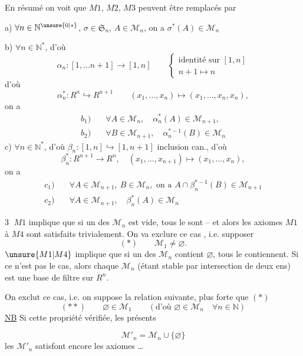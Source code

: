 En résumé on voit que $M1$, $M2$, $M3$ peuvent être remplacés par

a)  $\forall n\in\mathbb N^{\unsure{0|*}}$, $\sigma\in\mathfrak S_n$, $A\in\mathcal M_n$, on a $\sigma^*(A)\in\mathcal M_n$

b) $\forall n\in\mathbb N^*$, d'où
\[
\alpha_n:[1,\ldots n+1]\longrightarrow[1,n]\qquad
\left\{\begin{gathered}\text{identité sur }[1,n]\\ n+1\longmapsto n\end{gathered}\right.
\]
d'où 
\[
\alpha_n^*:R^n\hookrightarrow R^{n+1}\qquad(x_1,\ldots,x_n)\longmapsto(x_1,\ldots,x_n,x_n),
\]
on a
\[
\begin{aligned}
b_1)\quad&\forall A\in\mathcal M_n,\quad\alpha_n^*(A)\in\mathcal M_{n+1},\\
b_2)\quad&\forall B\in\mathcal M_{n+1},\quad\alpha_n^{*-1}(B)\in\mathcal M_n
\end{aligned}
\]
c) $\forall n\in\mathbb N^*$, d'où $\beta_n:[1,n]\hookrightarrow[1,n+1]$ inclusion can., d'où
\[
\beta_n^*:R^{n+1}\longrightarrow R^n,\quad(x_1,\ldots,x_{n+1})\longmapsto(x_1,\ldots,x_n),
\]
on a
\[
\begin{aligned}
c_1)\quad&\forall A\in\mathcal M_{n+1},\ B\in\mathcal M_n,\text{ on a }A\cap\beta_n^{*-1}(B)\in\mathcal M_{n+1}\\
c_2)\quad&\forall A\in\mathcal M_{n+1},\quad\beta_n^*(A)\in\mathcal M_n
\end{aligned}
\]

\textcircled{3} $M1$ implique que si un des $\mathcal M_n$ est vide, tous le sont -- et alors les axiomes $M1$ à $M4$ sont satisfaits trivialement. On va exclure ce cas , i.e. supposer
\[
(*)\qquad\mathcal M_1\ne\varnothing.
\]
$\unsure{M1|M4}$ implique que si un des $\mathcal M_n$ contient $\varnothing$, tous le contiennent. Si ce n'est pas le cas, alors chaque $\mathcal M_n$ (étant stable par intersection de deux ens) est une base de filtre sur $R^n$.

On exclut ce cas, i.e. on suppose la relation suivante, plus forte que $(*)$
\[
(**)\qquad\varnothing\in\mathcal M_1\qquad(\text{d'où }\varnothing\in\mathcal M_n\quad\forall n\in\mathbb N)
\]
\uline{NB} Si cette propriété  vérifiée, les présents

\[
\mathcal M'_n=\mathcal M_n\cup\{\varnothing\}
\]
les $\mathcal M'_n$ satisfont encore les axiomes \ldots

